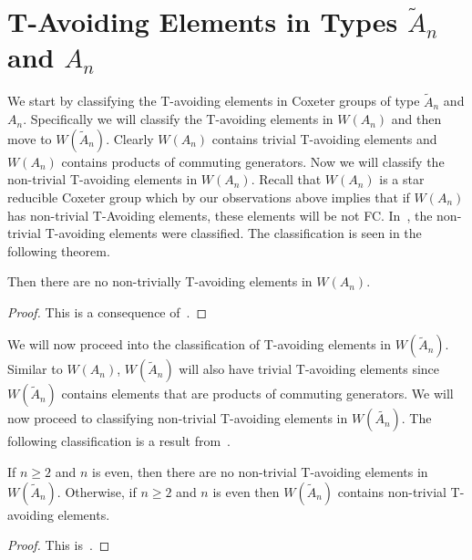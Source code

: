 
\section{T-Avoiding Elements in Types $\widetilde{A}_n$ and $A_n$}
We start by classifying the T-avoiding elements in Coxeter groups of type $\widetilde{A}_n$ and $A_n$. Specifically we will classify the T-avoiding elements in $W(A_n)$ and then move to $W(\widetilde{A}_n)$. Clearly $W(A_n)$ contains trivial T-avoiding elements and $W(A_n)$ contains products of commuting generators. Now we will classify the non-trivial T-avoiding elements in $W(A_n)$. Recall that $W(A_n)$ is a star reducible Coxeter group which by our observations above implies that if $W(A_n)$ has non-trivial T-Avoiding elements, these elements will be not FC. In~\cite{Fan1999}, the non-trivial T-avoiding elements were classified. The classification is seen in the following theorem.

\begin{theorem}
Then there are no non-trivially T-avoiding elements in $W(A_n)$. 
\begin{proof}
This is a consequence of~\cite[Proposition 3.1.2.]{Fan1999}.	 
\end{proof}
\end{theorem}

We will now proceed into the classification of T-avoiding elements in $W(\widetilde{A}_n)$. Similar to $W(A_n)$, $W(\widetilde{A}_n)$ will also have trivial T-avoiding elements since $W(\widetilde{A}_n)$ contains elements that are products of commuting generators. We will now proceed to classifying non-trivial T-avoiding elements in $W(\widetilde{A_n})$. The following classification is a result from~\cite{Fan1999}.

\begin{theorem}
 If $n \geq 2$ and $n$ is even, then there are no non-trivial T-avoiding elements in $W(\widetilde{A}_n)$. Otherwise, if $n \geq 2$ and $n$ is even then $W(\widetilde{A}_n)$ contains non-trivial T-avoiding elements.
\begin{proof}
	This is~\cite[Proposition~3.1.2.]{Fan1999}.
\end{proof}
\end{theorem}


